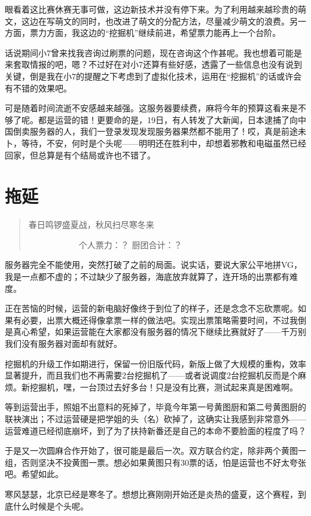 眼看着这比赛休赛无事可做，这边新技术并没有停下来。为了利用越来越珍贵的萌文，这边在写萌文的同时，也改进了萌文的分配方法，尽量减少萌文的浪费。另一方面，票力方面，我这边的“挖掘机”继续前进，希望票力能再上一个台阶。

话说期间小7曾来找我咨询过刷票的问题，现在咨询这个作甚呢。我也想着可能是来套取情报的吧，嗯？不过好在对小7还算有些好感，透露了一些信息也没有说到关键，倒是我在小7的提醒之下考虑到了虚拟化技术，运用在“挖掘机”的话或许会有不错的效果吧。

可是随着时间流逝不安感越来越强。这服务器要续费，麻将今年的预算这看来是不够了呢。都是运营的错！更要命的是，19日，有人转发了大新闻，日本逮捕了向中国倒卖服务器的人，我们一登录发现发现服务器果然都不能用了！哎，真是前途未卜，等待，不安，何时是个头呢——明明还在胜利中，却想着邪教和电磁虽然已经回家，但总算是有个结局或许也不错了。


\chapter{拖延}
\begin{quote}
春日鸣锣盛夏战，秋风扫尽寒冬来

　　　　　　个人票力：？ 厨团合计：？
\end{quote}

服务器完全不能使用，突然打破了之前的局面。说实话，要说大家公平地拼VG，我是一点都不虚的；不过缺少了服务器，海底放弃就算了，连开场的出票都有难度。

正在苦恼的时候，运营的新电脑好像终于到位了的样子，还是念念不忘砍票呢。如果有必要，出票大概还得像拿票一样的做法吧。实现出票策略需要时间，不过我倒是真心希望，如果运营能在大家都没有服务器的情况下继续比赛就好了——千万别我们没有服务器对面却有就好。

挖掘机的升级工作如期进行，保留一份旧版代码，新版上做了大规模的重构，效率显著提升，而且我们也不再需要2台挖掘机了——或者说调度2台挖掘机反而是个麻烦。新挖掘机，嘿，一台顶过去好多台！只是没有比赛，测试起来真是困难啊。

等到运营出手，照姐不出意料的死掉了，毕竟今年第一号黄图厨和第二号黄图厨的联袂演出；不过运营硬是把学姐的头（名）砍掉了，这确实让我感到非常意外——运营难道已经彻底崩坏，到了为了扶持新番还是自己的本命不要脸面的程度了吗？

于是又一次圆麻合作开始了，很可能是最后一次。双方联合约定，除非两个黄图一组，否则坚决不投黄图一票。想必如果黄图只有30票的话，怕是运营也不好太夸张吧。希望如此。

寒风瑟瑟，北京已经是寒冬了。想想比赛刚刚开始还是炎热的盛夏，这个赛程，到底什么时候是个头呢。

